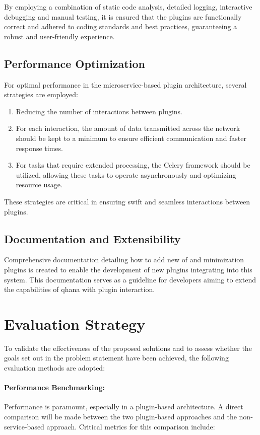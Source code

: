 \documentclass[
  a4paper,  %
  twoside,  %
  bibliography=totoc,
  headsepline,
  cleardoublepage=empty,
  parskip=half,
  draft=false
]{scrbook}
\begin{document}
By employing a combination of static code analysis, detailed logging, interactive debugging and manual testing, it is ensured that the plugins are functionally correct and adhered to coding standards and best practices, guaranteeing a robust and user-friendly experience.


\subsection{Performance Optimization}
For optimal performance in the microservice-based plugin architecture, several strategies are employed:

\begin{enumerate}
    \item Reducing the number of interactions between plugins.
    \item For each interaction, the amount of data transmitted across the network should be kept to a minimum to ensure efficient communication and faster response times.
    \item For tasks that require extended processing, the Celery framework should be utilized, allowing these tasks to operate asynchronously and optimizing resource usage.
\end{enumerate}

These strategies are critical in ensuring swift and seamless interactions between plugins.


\subsection{Documentation and Extensibility}
Comprehensive documentation detailing how to add new \gls{of} and minimization plugins is created to enable the development of new plugins integrating into this system.
This documentation serves as a guideline for developers aiming to extend the capabilities of \gls{qhana} with plugin interaction.


\section{Evaluation Strategy}
\label{sec:evaluationStrategy}

To validate the effectiveness of the proposed solutions and to assess whether the goals set out in the problem statement have been achieved, the following evaluation methods are adopted:

\paragraph{Performance Benchmarking:}
\label{subsec:performanceBenchmarking}
Performance is paramount, especially in a plugin-based architecture.
A direct comparison will be made between the two plugin-based approaches and the non-service-based approach.
Critical metrics for this comparison include:
\end{document}
